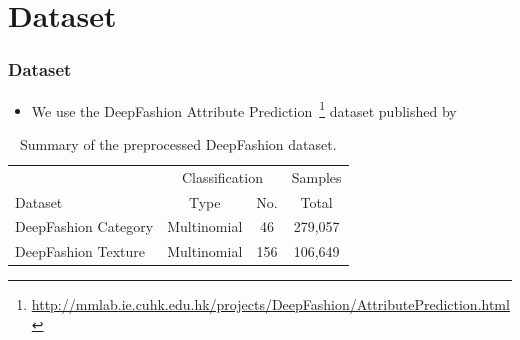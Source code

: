 \documentclass{beamer}
\begin{document}
	\section{Dataset}
	\begin{frame}
		\frametitle{Dataset}
		\begin{itemize}
			\item We use the DeepFashion Attribute Prediction~\footnote{\url{http://mmlab.ie.cuhk.edu.hk/projects/DeepFashion/AttributePrediction.html}} dataset published by \cite{liuLQWTcvpr16DeepFashion}
		\end{itemize}
		\begin{table}[H]
			\centering
			\begin{tabular}{ lccc } 
				\toprule
				& \multicolumn{2}{c}{Classification} & Samples \\
				\cmidrule{2-4}
				Dataset & Type & No. & Total \\
				\midrule
				DeepFashion Category & Multinomial & 46  & 279,057  \\
				DeepFashion Texture  & Multinomial & 156 & 106,649  \\
				\bottomrule
			\end{tabular}
			\caption{Summary of the preprocessed DeepFashion dataset.}
			\label{tab:deepfashion-deduplicated}
		\end{table}
	\end{frame}
	
\end{document}
